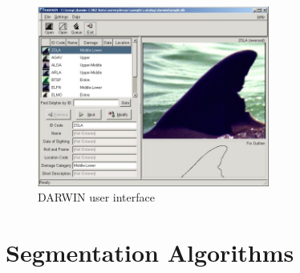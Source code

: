 \documentclass[a4paper,10pt]{article}
\begin{document}
\begin{figure}[H]
 \centering
 \includegraphics[width=3in]{Darwin.jpg}
 \caption{DARWIN user interface}
\end{figure}

\newpage
\section{Segmentation Algorithms}
\end{document}
